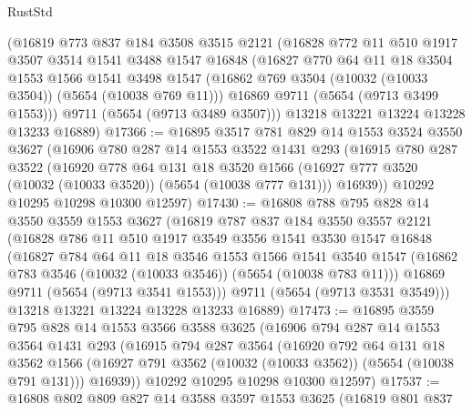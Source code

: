 \begin{lexlean}{RustStd}
\begin{coremodule}
    (@16819
      @773
      @837
      @184
      @3508
      @3515
      @2121
      (@16828
        @772
        @11
        @510
        @1917
        @3507
        @3514
        @1541
        @3488
        @1547
        @16848
        (@16827
          @770
          @64
          @11
          @18
          @3504
          @1553
          @1566
          @1541
          @3498
          @1547
          (@16862 @769 @3504 (@10032 (@10033 @3504)) (@5654 (@10038 @769 @11)))
          @16869
          @9711
          (@5654 (@9713 @3499 @1553)))
        @9711
        (@5654 (@9713 @3489 @3507)))
      @13218
      @13221
      @13224
      @13228
      @13233
      @16889)
@17366 := @16895
    @3517
    @781
    @829
    @14
    @1553
    @3524
    @3550
    @3627
    (@16906
      @780
      @287
      @14
      @1553
      @3522
      @1431
      @293
      (@16915
        @780
        @287
        @3522
        (@16920
          @778
          @64
          @131
          @18
          @3520
          @1566
          (@16927 @777 @3520 (@10032 (@10033 @3520)) (@5654 (@10038 @777 @131)))
          @16939))
      @10292
      @10295
      @10298
      @10300
      @12597)
@17430 := @16808
    @788
    @795
    @828
    @14
    @3550
    @3559
    @1553
    @3627
    (@16819
      @787
      @837
      @184
      @3550
      @3557
      @2121
      (@16828
        @786
        @11
        @510
        @1917
        @3549
        @3556
        @1541
        @3530
        @1547
        @16848
        (@16827
          @784
          @64
          @11
          @18
          @3546
          @1553
          @1566
          @1541
          @3540
          @1547
          (@16862 @783 @3546 (@10032 (@10033 @3546)) (@5654 (@10038 @783 @11)))
          @16869
          @9711
          (@5654 (@9713 @3541 @1553)))
        @9711
        (@5654 (@9713 @3531 @3549)))
      @13218
      @13221
      @13224
      @13228
      @13233
      @16889)
@17473 := @16895
    @3559
    @795
    @828
    @14
    @1553
    @3566
    @3588
    @3625
    (@16906
      @794
      @287
      @14
      @1553
      @3564
      @1431
      @293
      (@16915
        @794
        @287
        @3564
        (@16920
          @792
          @64
          @131
          @18
          @3562
          @1566
          (@16927 @791 @3562 (@10032 (@10033 @3562)) (@5654 (@10038 @791 @131)))
          @16939))
      @10292
      @10295
      @10298
      @10300
      @12597)
@17537 := @16808
    @802
    @809
    @827
    @14
    @3588
    @3597
    @1553
    @3625
    (@16819
      @801
      @837

\end{coremodule}
\end{lexlean}
